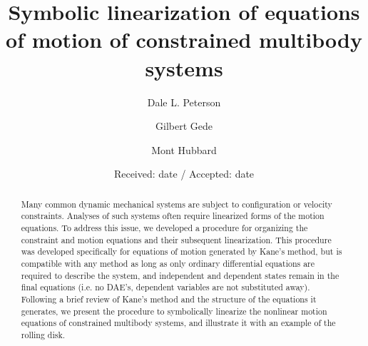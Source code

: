 \documentclass[smallcondensed,final]{svjour3}                     %
\begin{document}
\title{Symbolic linearization of equations of motion of constrained multibody systems}


\author{Dale L. Peterson\and Gilbert Gede\and Mont Hubbard}


\date{Received: date / Accepted: date}

\maketitle

\begin{abstract}
Many common dynamic mechanical systems are subject to configuration or velocity
constraints.
Analyses of such systems often require linearized forms of the motion
equations.
To address this issue, we developed a procedure for organizing the constraint
and motion equations and their subsequent linearization.  This procedure was
developed specifically for equations of motion generated by Kane's method, but
is compatible with any method as long as only ordinary differential equations
are required to describe the system, and independent and dependent states
remain in the final equations (i.e. no DAE's, dependent variables are not
substituted away).
Following a brief review of Kane's method and the structure of the equations it
generates, we present the procedure to symbolically linearize the nonlinear
motion equations of constrained multibody systems, and illustrate it with an
example of the rolling disk.

\end{abstract}
\end{document}
